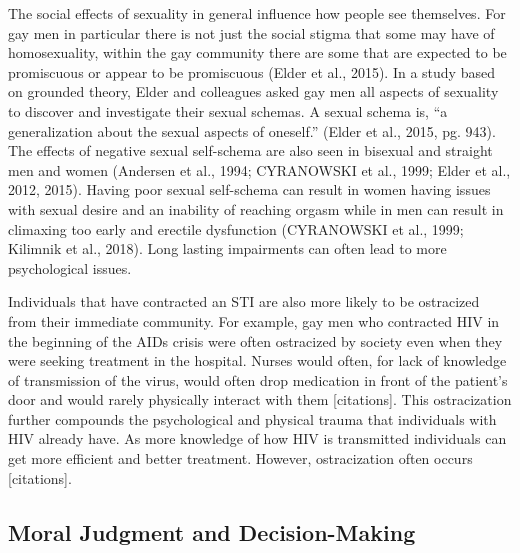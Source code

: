 \documentclass[
  english,
  donotrepeattitle,doc, 12pt, a4paper,floatsintext]{apa7}
\begin{document}
The social effects of sexuality in general influence how people see themselves. For gay men in particular there is not just the social stigma that some may have of homosexuality, within the gay community there are some that are expected to be promiscuous or appear to be promiscuous (Elder et al., 2015). In a study based on grounded theory, Elder and colleagues asked gay men all aspects of sexuality to discover and investigate their sexual schemas. A sexual schema is, ``a generalization about the sexual aspects of oneself.'' (Elder et al., 2015, pg. 943). The effects of negative sexual self-schema are also seen in bisexual and straight men and women (Andersen et al., 1994; CYRANOWSKI et al., 1999; Elder et al., 2012, 2015). Having poor sexual self-schema can result in women having issues with sexual desire and an inability of reaching orgasm while in men can result in climaxing too early and erectile dysfunction (CYRANOWSKI et al., 1999; Kilimnik et al., 2018). Long lasting impairments can often lead to more psychological issues.

Individuals that have contracted an STI are also more likely to be ostracized from their immediate community. For example, gay men who contracted HIV in the beginning of the AIDs crisis were often ostracized by society even when they were seeking treatment in the hospital. Nurses would often, for lack of knowledge of transmission of the virus, would often drop medication in front of the patient's door and would rarely physically interact with them {[}citations{]}. This ostracization further compounds the psychological and physical trauma that individuals with HIV already have. As more knowledge of how HIV is transmitted individuals can get more efficient and better treatment. However, ostracization often occurs {[}citations{]}.

\hypertarget{moral-judgment-and-decision-making}{%
\subsection{Moral Judgment and Decision-Making}\label{moral-judgment-and-decision-making}}
\end{document}
